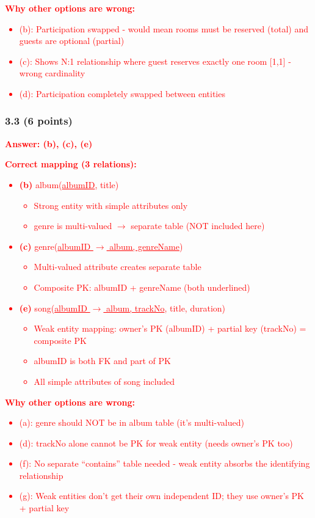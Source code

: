 \documentclass[11pt,a4paper]{article}
\begin{document}
\textcolor{red}{\textbf{Why other options are wrong:}}
\textcolor{red}{\begin{itemize}
\item (b): Participation swapped - would mean rooms must be reserved (total) and guests are optional (partial)
\item (c): Shows N:1 relationship where guest reserves exactly one room [1,1] - wrong cardinality
\item (d): Participation completely swapped between entities
\end{itemize}}

\subsubsection*{3.3 (6 points)}
\textcolor{red}{\textbf{Answer: (b), (c), (e)}}

\textcolor{red}{\textbf{Correct mapping (3 relations):}}
\textcolor{red}{\begin{itemize}
\item \textbf{(b)} album(\underline{albumID}, title)
  \begin{itemize}
  \item Strong entity with simple attributes only
  \item genre is multi-valued $\rightarrow$ separate table (NOT included here)
  \end{itemize}
\item \textbf{(c)} genre(\underline{albumID $\rightarrow$ album, genreName})
  \begin{itemize}
  \item Multi-valued attribute creates separate table
  \item Composite PK: albumID + genreName (both underlined)
  \end{itemize}
\item \textbf{(e)} song(\underline{albumID $\rightarrow$ album, trackNo}, title, duration)
  \begin{itemize}
  \item Weak entity mapping: owner's PK (albumID) + partial key (trackNo) = composite PK
  \item albumID is both FK and part of PK
  \item All simple attributes of song included
  \end{itemize}
\end{itemize}}

\textcolor{red}{\textbf{Why other options are wrong:}}
\textcolor{red}{\begin{itemize}
\item (a): genre should NOT be in album table (it's multi-valued)
\item (d): trackNo alone cannot be PK for weak entity (needs owner's PK too)
\item (f): No separate ``contains'' table needed - weak entity absorbs the identifying relationship
\item (g): Weak entities don't get their own independent ID; they use owner's PK + partial key
\end{itemize}}
\end{document}
